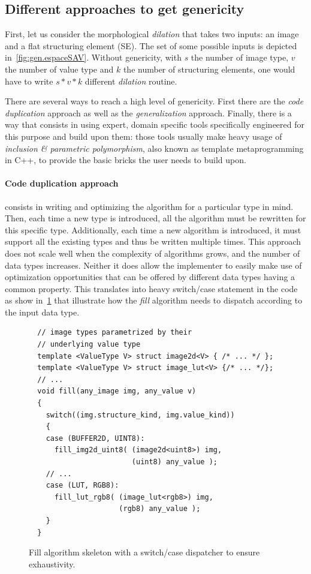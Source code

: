 \subsection{Different approaches to get genericity}
\label{subsec:different.approaches}

First, let us consider the morphological \emph{dilation} that takes two inputs: an image and a flat structuring element
(SE). The set of some possible inputs is depicted in~\ref{fig:gen.espaceSAV}. Without genericity, with $s$ the
number of image type, $v$ the number of value type and $k$ the number of structuring elements, one would have to write
$s * v * k$ different \emph{dilation} routine.

There are several ways to reach a high level of genericity. First there are the \emph{code duplication} approach as well
as the \emph{generalization} approach. Finally, there is a way that consists in using expert, domain specific tools
specifically engineered for this purpose and build upon them: those tools usually make heavy usage of \emph{inclusion
  \& parametric polymorphism}, also known as template metaprogramming in C++, to provide the basic bricks the user needs
to build upon.

\paragraph{Code duplication approach} consists in writing and optimizing the algorithm for a particular type in mind.
Then, each time a new type is introduced, all the algorithm must be rewritten for this specific type. Additionally, each
time a new algorithm is introduced, it must support all the existing types and thus be written multiple times. This
approach does not scale well when the complexity of algorithms grows, and the number of data types increases. Neither it
does allow the implementer to easily make use of optimization opportunities that can be offered by different data types
having a common property. This translates into heavy switch/case statement in the code as show in~\ref{code:gen.exhau}
that illustrate how the \emph{fill} algorithm needs to dispatch according to the input data type.

\begin{figure}[tbh]
  \centering
  \begin{verbatim}
  // image types parametrized by their
  // underlying value type
  template <ValueType V> struct image2d<V> { /* ... */ };
  template <ValueType V> struct image_lut<V> {/* ... */};
  // ...
  void fill(any_image img, any_value v)
  {
    switch((img.structure_kind, img.value_kind))
    {
    case (BUFFER2D, UINT8):
      fill_img2d_uint8( (image2d<uint8>) img,
                        (uint8) any_value );
    // ...
    case (LUT, RGB8):
      fill_lut_rgb8( (image_lut<rgb8>) img,
                     (rgb8) any_value );
    }
  }
  \end{verbatim}
  \caption{Fill algorithm skeleton with a switch/case dispatcher to ensure exhaustivity.}
  \label{code:gen.exhau}
\end{figure}

